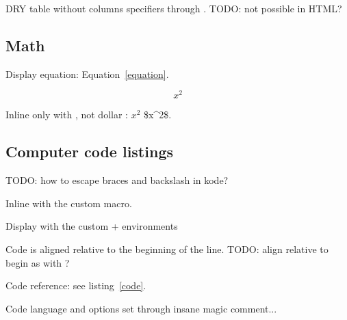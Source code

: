     DRY table without columns specifiers through \kode{*}. TODO: not possible in HTML?


  \subsection{Math}

    Display equation: Equation~\ref{equation}.

    \begin{equation}\label{equation}
      x^2
    \end{equation}

    Inline only with \kode{\(  \)}, not dollar \kode{\$}: \( x^2 \) \$x\^{}2\$.

  \subsection{Computer code listings}

    TODO: how to escape braces and backslash in kode? %

    Inline with the custom  macro.

    Display with the custom  +  environments

    Code is aligned relative to the beginning of the line. TODO: align relative to begin as with ?

    Code reference: see listing~\ref{code}.

    Code language and options set through insane magic comment...

    \begin{codelisting}
      \label{code}
      \begin{code}
      \end{code}
    \end{codelisting}
